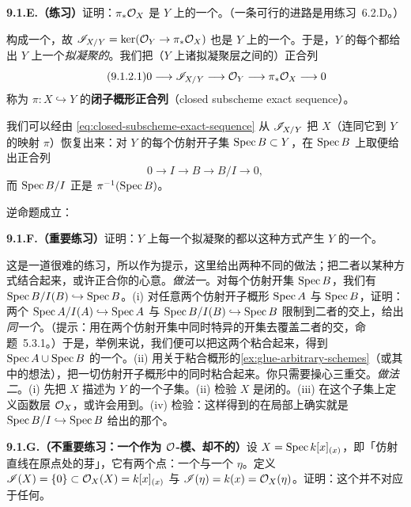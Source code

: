 \textbf{9.1.E.（练习）}\quad 证明：$\pi_*\mathcal{O}_X$ 是 $Y$ 上的一个\trQCSheaf{}。（一条可行的进路是用\mbox{练习~6.2.D}。）

\trQCSheaf{}构成一个\trAbelianCategory，故 $\mathscr{I}_{X/Y}=\ker(\mathcal{O}_Y\to\pi_*\mathcal{O}_X)$ 也是 $Y$ 上的一个\trQCSheaf。于是，$Y$ 的每个\trClosedSubscheme{}都给出 $Y$ 上一个\emph{拟凝聚的}\trIdealSheaf{}。我们把（$Y$ 上诸拟凝聚层之间的）正合列
\begin{equation*}\tag{9.1.2.1}\label{eq:closed-subscheme-exact-sequence}
0\longrightarrow\mathscr{I}_{X/Y}\longrightarrow\mathcal{O}_Y\longrightarrow\pi_*\mathcal{O}_X\longrightarrow 0
\end{equation*}
称为 $\pi\colon X\hookrightarrow Y$ 的\textbf{闭子概形正合列}（closed subscheme exact sequence）。

我们可以经由 \eqref{eq:closed-subscheme-exact-sequence} 从\trIdealSheaf{} $\mathscr{I}_{X/Y}$ 把 $X$（连同它到 $Y$ 的映射 $\pi$）恢复出来：对 $Y$ 的每个仿射开子集 $\operatorname{Spec} B\subset Y$，在 $\operatorname{Spec} B$ 上取\trSection{}便给出正合列
\[
0\longrightarrow I\longrightarrow B\longrightarrow B/I\longrightarrow 0,
\]
而 $\operatorname{Spec} B/I$ 正是 $\pi^{-1}(\operatorname{Spec} B)$。

逆命题成立：

\textbf{9.1.F.（重要练习）}\quad 证明：$Y$ 上每一个拟凝聚的\trIdealSheaf{}都以这种方式产生 $Y$ 的一个\trClosedSubscheme。

这是一道很难的练习，所以作为提示，这里给出两种不同的做法；把二者以某种方式结合起来，或许正合你的心意。\emph{做法一}。对每个仿射开集 $\operatorname{Spec} B$，我们有\trClosedSubscheme{} $\operatorname{Spec} B/I(B)\hookrightarrow\operatorname{Spec} B$。(i) 对任意两个仿射开子概形 $\operatorname{Spec} A$ 与 $\operatorname{Spec} B$，证明：两个\trClosedSubscheme{} $\operatorname{Spec} A/I(A)\hookrightarrow\operatorname{Spec} A$ 与 $\operatorname{Spec} B/I(B)\hookrightarrow\operatorname{Spec} B$ 限制到二者的交上，给出\emph{同一个}\trClosedSubscheme。（提示：用在两个仿射开集中同时特异的开集去覆盖二者的交，命题~5.3.1。）于是，举例来说，我们便可以把这两个\trClosedSubscheme{}粘合起来，得到 $\operatorname{Spec} A\cup\operatorname{Spec} B$ 的一个\trClosedSubscheme。(ii) 用关于粘合概形的\cref{ex:glue-arbitrary-schemes}（或其中的想法），把一切仿射开子概形中的\trClosedEmbedding{}同时粘合起来。你只需要操心三重交。\emph{做法二}。(i) 先把 $X$ 描述为 $Y$ 的一个子集。(ii) 检验 $X$ 是闭的。(iii) 在这个子集上定义函数层 $\mathcal{O}_X$，或许会用到\trCompatibleGerm。(iv) 检验：这样得到的\trRingedSpace{}在局部上确实就是 $\operatorname{Spec} B/I\hookrightarrow\operatorname{Spec} B$ 给出的那个\trClosedSubscheme。

\textbf{9.1.G.（不重要练习：一个作为 $\mathcal{O}$-模、却不\trQC{}的\trIdealSheaf{}）}\quad 设 $X=\operatorname{Spec} k[x]_{(x)}$，即「仿射直线在原点处的芽」，它有两个点：一个\trClosedPoint{}与一个\trGenericPoint{} $\eta$。定义 $\mathscr{I}(X)=\{0\}\subset\mathcal{O}_X(X)=k[x]_{(x)}$ 与 $\mathscr{I}(\eta)=k(x)=\mathcal{O}_X(\eta)$。证明：这个\trIdealSheaf{}并不对应于任何\trClosedSubscheme。

